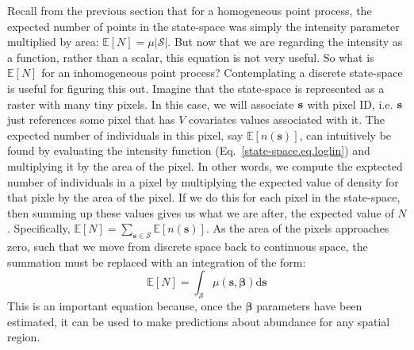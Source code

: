 Recall from the previous section that for a homogeneous point process,
the expected number of points in the state-space was simply the
intensity parameter multiplied by area: $\mathbb{E}[N] =
\mu|\mathcal{S}|$. But now that we are regarding the intensity as a
function, rather than a scalar, this equation is not very useful. So
what is $\mathbb{E}[N]$ for an inhomogeneous point process?
Contemplating a discrete state-space is useful for figuring this
out. Imagine that the state-space is represented as a raster with many
tiny pixels. In this case, we will associate
$\bf s$ with pixel ID, i.e. $\bf s$ just references some pixel that
has $V$ covariates values associated with it. The expected number of
individuals in this pixel, say $\mathbb{E}[n(\mathbf{s})]$, can intuitively be
found by evaluating the intensity function
(Eq.~\ref{state-space.eq.loglin}) and multiplying it by the area of
the pixel. In other words, we compute the exptected number of
individuals in a pixel by multiplying the expected value of density
for that pixle by the area of the pixel. If we do this for each pixel in the state-space, then
summing up these values gives us what we are after, the expected value
of $N$. Specifically,
$\mathbb{E}[N] = \sum_{\mathbf{s} \in \mathcal{S}} \mathbb{E}[n(\mathbf{s})]$.
As the area of the pixels approaches zero, such that we move from discrete
space back to continuous space, the summation must be replaced
with an integration of the form:
\begin{equation}
\mathbb{E}[N] = \int_{\mathcal{S}} \mu(\mathbf{s}, {\bm \beta}) \mathrm{d}\mathbf{s}
\label{state-space.eq.EN}
\end{equation}
This is an important equation because, once the $\bm \beta$ parameters
have been estimated, it can be used to make predictions
about abundance for any spatial region.

